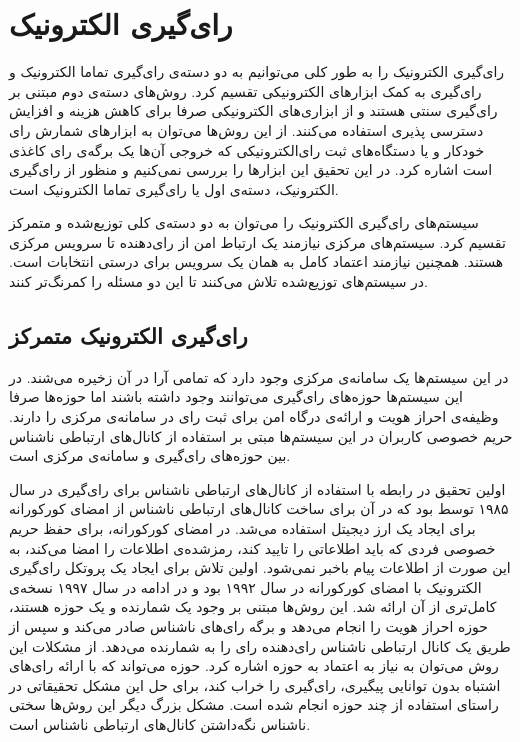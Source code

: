 \section{رای‌گیری الکترونیک}
رای‌گیری الکترونیک را به طور کلی می‌توانیم به دو دسته‌ی رای‌گیری تماما الکترونیک و رای‌گیری به کمک ابزار‌های الکترونیکی تقسیم کرد. روش‌های دسته‌ی دوم مبتنی بر رای‌گیری سنتی هستند و از ابزاری‌های الکترونیکی صرفا برای کاهش هزینه و افزایش دسترسی پذیری استفاده می‌کنند. از این روش‌ها می‌توان به ابزارهای شمارش رای خودکار و یا دستگاه‌های ثبت رای‌الکترونیکی که خروجی آن‌ها یک برگه‌ی رای‌ کاغذی
 است اشاره کرد. در این تحقیق این ابزارها را بررسی نمی‌کنیم و منظور از رای‌گیری الکترونیک، دسته‌ی اول یا رای‌گیری تماما الکترونیک است.
 \par
سیستم‌های رای‌گیری الکترونیک را می‌توان به دو دسته‌ی کلی توزیع‌شده و متمرکز تقسیم کرد. سیستم‌های مرکزی نیازمند یک ارتباط امن از رای‌دهنده تا سرویس مرکزی هستند. همچنین نیازمند اعتماد کامل به همان یک سرویس برای درستی انتخابات است. در سیستم‌های توزیع‌شده تلاش می‌کنند تا این دو مسئله را کمرنگ‌تر کنند.

\subsection{رای‌گیری الکترونیک متمرکز}
در این سیستم‌ها یک سامانه‌ی مرکزی وجود دارد که تمامی آرا در آن زخیره می‌شند. در این سیستم‌ها حوزه‌های رای‌گیری می‌توانند وجود داشته باشند اما حوزه‌ها صرفا وظیفه‌ی احراز هویت و ارائه‌ی درگاه امن برای ثبت رای در سامانه‌ی مرکزی را دارند. حریم خصوصی کاربران در این سیستم‌ها مبتی بر استفاده از کانال‌های ارتباطی ناشناس 
بین حوزه‌های رای‌گیری و سامانه‌ی مرکزی است.
\par
 اولین تحقیق در رابطه با استفاده‌ از کانال‌های ارتباطی ناشناس برای رای‌گیری در سال ۱۹۸۵ توسط 
\cite{Chaum}
بود که در آن برای ساخت‌ کانال‌های ارتباطی ناشناس از امضای کورکورانه 
\cite{blindsig}
برای ایجاد یک ارز دیجیتل استفاده می‌شد. در امضای کورکورانه، برای حفظ حریم خصوصی فردی که باید اطلاعاتی را تایید کند، رمزشده‌ی اطلاعات را امضا می‌کند، به این صورت از اطلاعات پیام باخبر نمی‌شود. اولین تلاش برای ایجاد یک پروتکل رای‌گیری الکترونیک با امضای کورکورانه در سال ۱۹۹۲ 
\cite{foo92}
بود و در ادامه در سال ۱۹۹۷
\cite{improveblind}
نسخه‌ی کامل‌تری از آن ارائه شد. این روش‌ها مبتنی بر وجود یک شمارنده و یک حوزه هستند، حوزه احراز هویت را انجام می‌دهد و برگه‌ رای‌های ناشناس صادر می‌کند و سپس از طریق یک کانال ارتباطی ناشناس رای‌دهنده رای را به شمارنده می‌دهد. از مشکلات این روش می‌توان به نیاز به اعتماد به حوزه اشاره کرد. حوزه می‌تواند که با ارائه رای‌های اشتباه بدون توانایی پیگیری، رای‌گیری را خراب کند، برای حل این مشکل تحقیقاتی
\cite{multiteller}
 در راستای استفاده از چند حوزه انجام شده است. مشکل بزرگ دیگر این روش‌ها
\cite{anonchan}
  سختی ناشناس نگه‌داشتن کانال‌های ارتباطی ناشناس است.

